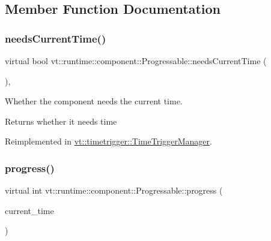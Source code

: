 \subsection{Member Function Documentation}
\mbox{\label{structvt_1_1runtime_1_1component_1_1_progressable_a86dd4c58e43f7dbf6bd67f7a8e6df088}} 
\subsubsection{\texorpdfstring{needs\+Current\+Time()}{needsCurrentTime()}}
{\footnotesize\ttfamily virtual bool vt\+::runtime\+::component\+::\+Progressable\+::needs\+Current\+Time (\begin{DoxyParamCaption}{ }\end{DoxyParamCaption})\hspace{0.3cm}{\ttfamily [inline]}, {\ttfamily [virtual]}}



Whether the component needs the current time. 

\begin{DoxyReturn}{Returns}
whether it needs time 
\end{DoxyReturn}


Reimplemented in \hyperlink{structvt_1_1timetrigger_1_1_time_trigger_manager_a2e65cfcbbbb1224b08263996b0fb1eff}{vt\+::timetrigger\+::\+Time\+Trigger\+Manager}.

\mbox{\label{structvt_1_1runtime_1_1component_1_1_progressable_a75f1e623643f2273835fdf047d3d0cd3}} 
\subsubsection{\texorpdfstring{progress()}{progress()}}
{\footnotesize\ttfamily virtual int vt\+::runtime\+::component\+::\+Progressable\+::progress (\begin{DoxyParamCaption}\item[{\hyperlink{namespacevt_a2b9f28078dc309ad0706b69ded743e69}{Time\+Type}}]{current\+\_\+time }\end{DoxyParamCaption})\hspace{0.3cm}{\ttfamily [pure virtual]}}



